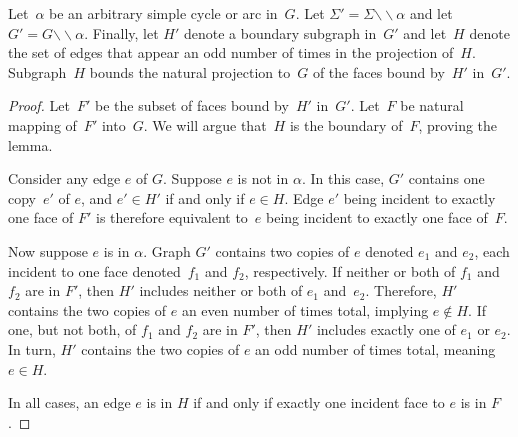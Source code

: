 \documentclass[letterpaper,review]{siamart190516}
\def\snip{\mathbin{\raisebox{0.15ex}{\rotatebox[origin=c]{60}{\Rightscissors}\!}}}
\def\snip{\mathbin{\backslash\!\!\backslash}}
\def\subsnip{\mathbin{\raisebox{0.15ex}{\rotatebox[origin=c]{60}{\footnotesize\Rightscissors}\!}}}
\def\Gsnip{\mathord{G_{\subsnip}}}
\def\Sigmasnip{\mathord{\Sigma_{\subsnip}}}
\def\gammasnip{\mathord{\gamma_{\subsnip}}}
\def\Gsnip{G'}
\def\Fsnip{F'}
\def\Sigmasnip{\Sigma'}
\def\gammasnip{\gamma'}
\def\Hsnip{H'}
\def\knote#1{\textcolor{olive}{Kyle: #1}}
\begin{document}
{%
\begin{lemma}
\label{lem:global_null-homologous-projections}
Let~$\alpha$ be an arbitrary simple cycle or arc in~$G$.
Let
${\Sigmasnip = \Sigma \snip \alpha}$ and let~$\Gsnip = G \snip \alpha$.
Finally, let \(\Hsnip\) denote a boundary subgraph in~\(\Gsnip\) and let~\(H\)
denote the set of edges that appear an odd number of times in the projection of~\(H\).
Subgraph~\(H\) bounds the natural projection to~\(G\) of the faces bound by~\(\Hsnip\)
in~\(\Gsnip\).
\end{lemma}

\begin{proof}
Let~\(\Fsnip\) be the subset of faces bound by~$\Hsnip$ in~$\Gsnip$. 
Let~$F$ be natural mapping of~$\Fsnip$ into~$G$.
We will argue that~$H$ is the boundary of~$F$, proving the lemma.

Consider any edge $e$ of $G$.
Suppose $e$ is not in $\alpha$.
In this case, $\Gsnip$ contains one copy~$e'$ of $e$, and \(e' \in H'\) if and only if \(e \in H\).
Edge $e'$ being incident to exactly one face of $\Fsnip$ is therefore equivalent to~\(e\) being
incident to exactly one face of~\(F\).

Now suppose $e$ is in $\alpha$.
Graph $\Gsnip$ contains two copies of $e$ denoted $e_1$ and $e_2$, each incident to one face denoted~$f_1$ and $f_2$, respectively.
If neither or both of $f_1$ and $f_2$ are in $\Fsnip$, then $\Hsnip$ includes neither or both of
$e_1$ and~$e_2$.
Therefore, $\Hsnip$ contains the two copies of $e$ an even number of times total, implying $e \notin H$.
If one, but not both, of $f_1$ and $f_2$ are in $\Fsnip$, then $\Hsnip$ includes exactly one of
$e_1$ or $e_2$.
In turn, $\Hsnip$ contains the two copies of $e$ an odd number of times total, meaning $e \in H$.

In all cases, an edge $e$ is in $H$ if and only if exactly one incident face to $e$ is in $F$.
\end{proof}

}
\end{document}

